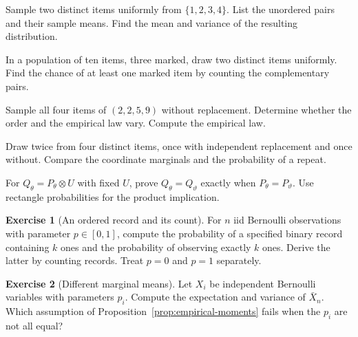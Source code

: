 \documentclass[11pt,oneside]{book}
\theoremstyle{definition}
\newtheorem{exercise}{Exercise}[section]
\theoremstyle{remark}
\begin{document}
\begin{practiceexercise}
\label{wex:four-values-without-replacement}
Sample two distinct items uniformly from $\{1,2,3,4\}$. List the unordered
pairs and their sample means. Find the mean and variance of the resulting
distribution.
\end{practiceexercise}

\begin{practiceexercise}
\label{wex:rare-in-population}
In a population of ten items, three marked, draw two distinct items
uniformly. Find the chance of at least one marked item by counting the
complementary pairs.
\end{practiceexercise}

\begin{practiceexercise}
\label{wex:census-empirical-law}
Sample all four items of $(2,2,5,9)$ without replacement. Determine whether
the order and the empirical law vary. Compute the empirical law.
\end{practiceexercise}

\begin{practiceexercise}
\label{wex:distinct-items-collision}
Draw twice from four distinct items, once with independent replacement and
once without. Compare the coordinate marginals and the probability of a
repeat.
\end{practiceexercise}

\begin{practiceexercise}
\label{wex:third-coordinate-marginal}
For $Q_\theta=P_\theta\otimes U$ with fixed $U$, prove
$Q_\theta=Q_\vartheta$ exactly when $P_\theta=P_\vartheta$. Use rectangle
probabilities for the product implication.
\end{practiceexercise}

\begin{exercise}[An ordered record and its count]
\label{exer:bernoulli-record-count}
For $n$ iid Bernoulli observations with parameter $p\in[0,1]$, compute the
probability of a specified binary record containing $k$ ones and the
probability of observing exactly $k$ ones. Derive the latter by counting
records. Treat $p=0$ and $p=1$ separately.
\end{exercise}

\begin{exercise}[Different marginal means]
\label{exer:nonidentical-bernoulli}
Let $X_i$ be independent Bernoulli variables with parameters $p_i$.
Compute the expectation and variance of $\bar X_n$.
Which assumption of Proposition~\ref{prop:empirical-moments} fails when the
$p_i$ are not all equal?
\end{exercise}
\end{document}
